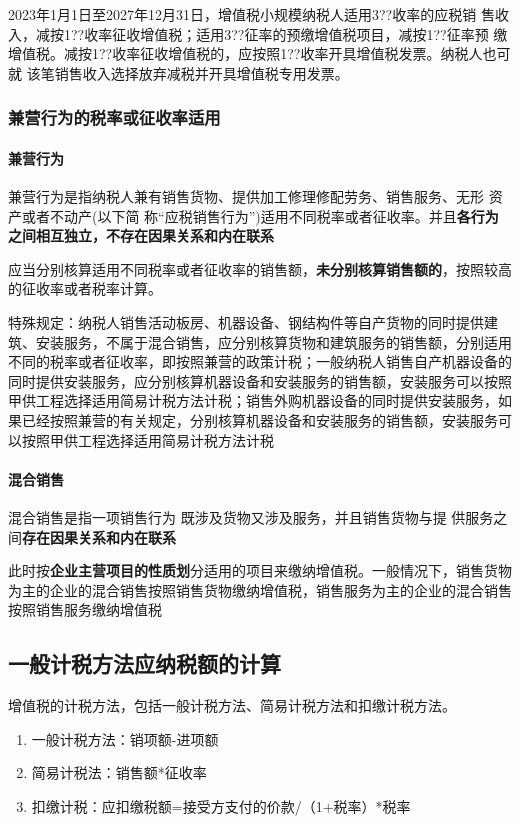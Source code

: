 \documentclass[UTF8,12pt]{ctexart}
\numberwithin{equation}{section} %
\numberwithin{figure}{section}
\numberwithin{table}{section}
\begin{document}
	2023年1月1日至2027年12月31日，增值税小规模纳税人适用3??收率的应税销
	售收入，减按1??收率征收增值税；适用3??征率的预缴增值税项目，减按1??征率预
	缴增值税。减按1??收率征收增值税的，应按照1??收率开具增值税发票。纳税人也可就
	该笔销售收入选择放弃减税并开具增值税专用发票。
	
	\subsubsection{兼营行为的税率或征收率适用}
	\paragraph{兼营行为}
	兼营行为是指纳税人兼有销售货物、提供加工修理修配劳务、销售服务、无形 资产或者不动产(以下简 称“应税销售行为”)适用不同税率或者征收率。并且\textbf{各行为之间相互独立，不存在因果关系和内在联系} 
	
	应当分别核算适用不同税率或者征收率的销售额，\textbf{未分别核算销售额的}，按照较高的征收率或者税率计算。
	
	特殊规定：纳税人销售活动板房、机器设备、钢结构件等自产货物的同时提供建筑、安装服务，不属于混合销售，应分别核算货物和建筑服务的销售额，分别适用不同的税率或者征收率，即按照兼营的政策计税；一般纳税人销售自产机器设备的同时提供安装服务，应分别核算机器设备和安装服务的销售额，安装服务可以按照甲供工程选择适用简易计税方法计税；销售外购机器设备的同时提供安装服务，如果已经按照兼营的有关规定，分别核算机器设备和安装服务的销售额，安装服务可以按照甲供工程选择适用简易计税方法计税
	
	\paragraph{混合销售}
	混合销售是指一项销售行为 既涉及货物又涉及服务，并且销售货物与提 供服务之间\textbf{存在因果关系和内在联系}
	
	此时按\textbf{企业主营项目的性质划}分适用的项目来缴纳增值税。一般情况下，销售货物为主的企业的混合销售按照销售货物缴纳增值税，销售服务为主的企业的混合销售按照销售服务缴纳增值税
	
	\subsection{一般计税方法应纳税额的计算}
	增值税的计税方法，包括一般计税方法、简易计税方法和扣缴计税方法。
	\begin{enumerate}
		\item 一般计税方法：销项额-进项额
		
		\item 简易计税法：销售额*征收率
		
		\item 扣缴计税：应扣缴税额=接受方支付的价款/（1+税率）*税率
	\end{enumerate}
	
\end{document}
